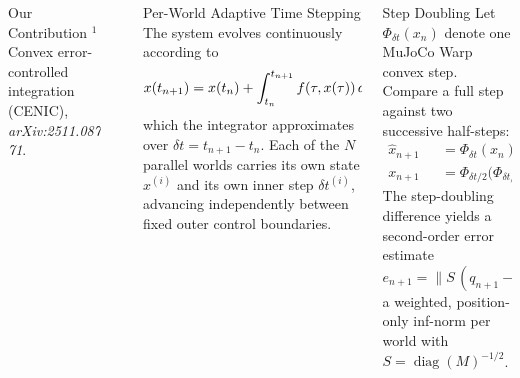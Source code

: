 \documentclass[final]{beamer}
\newlength{\sepwid}
\newlength{\onecolwid}
\newlength{\twocolwid}
\begin{document}
\begin{frame}[t]
\begin{columns}[t]
\begin{column}{\onecolwid}
\begin{block}{Our Contribution}
\medskip
\footnotesize$^{1}$Convex error-controlled integration (CENIC),
\textit{arXiv:2511.08771}.\normalsize
\end{block}

\end{column}

\begin{column}{\sepwid}\end{column}

\begin{column}{\twocolwid}

\begin{columns}[t,totalwidth=\twocolwid]

\begin{column}{\onecolwid}\vspace{-.6in}

\begin{block}{Per-World Adaptive Time Stepping}
The system evolves continuously according to
\[
\Large
x(t_{n+1}) = x(t_n) + \int_{t_n}^{t_{n+1}} f(\tau, x(\tau))\,d\tau,
\]
which the integrator approximates over $\delta t = t_{n+1} - t_n$.
Each of the $N$ parallel worlds carries its own state $x^{(i)}$ and
its own inner step $\delta t^{(i)}$, advancing independently between
fixed outer control boundaries.
\end{block}

\end{column}

\begin{column}{\onecolwid}\vspace{-.6in}

\begin{block}{Step Doubling}
Let $\Phi_{\delta t}(x_n)$ denote one MuJoCo Warp convex step. Compare a
full step against two successive half-steps:
\begin{align}
\hat{x}_{n+1} &= \Phi_{\delta t}(x_n), \\
x_{n+1}\;\;\, &= \Phi_{\delta t/2}\bigl(\Phi_{\delta t/2}(x_n)\bigr).
\end{align}
The step-doubling difference yields a second-order error estimate
\begin{equation}
e_{n+1} = \lVert S\,(q_{n+1} - \hat{q}_{n+1}) \rVert_{\infty}
       \approx \bar{c}\,\delta t^{\,p}, \quad p = 2,
\end{equation}
a weighted, position-only inf-norm per world with $S = \operatorname{diag}(M)^{-1/2}$.
\end{block}


\end{column}
\end{columns}
\end{column}
\end{columns}
\end{frame}
\end{document}
